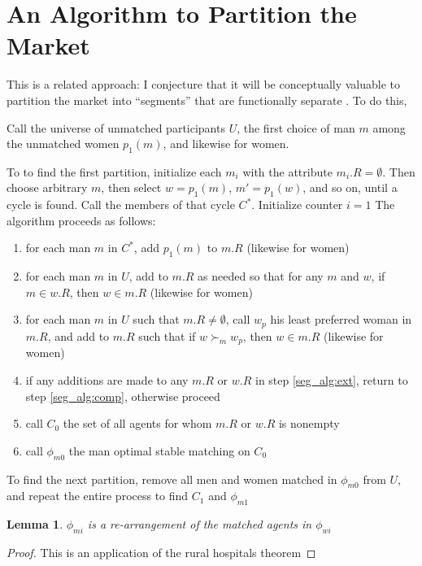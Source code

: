 \documentclass[WP]{AEA}
\newtheorem{lemma}{Lemma}
\begin{document}
\section{An Algorithm to Partition the Market} \label{sect:partition}
This is a related approach: I conjecture that it will be conceptually valuable to partition the market into ``segments'' that are functionally separate .  To do this, 


Call the universe of unmatched participants $U$, the first choice of man $m$ among the unmatched women $p_1(m)$, and likewise for women.


To to find the first partition, initialize each $m_i$ with the attribute $m_i.R = \emptyset$. Then choose arbitrary $m$, then select $w = p_1(m)$, $m' = p_1(w)$, and so on, until a cycle is found. Call the members of that cycle $C^*$. Initialize counter $i = 1$  The algorithm proceeds as follows: 


\begin{enumerate}
	\item for each man $m$ in $C^*$, add $p_1(m)$ to $m.R$ (likewise for women)
	\item  \label{seg_alg:comp} for each man $m$ in $U$, add to $m.R$ as needed so that for any $m$ and $w$, if $m \in w.R$, then $w \in m.R$  (likewise for women)
	\item  \label{seg_alg:ext} for each man $m$ in $U$ such that $m.R \neq \emptyset$, call  $w_p$ his least preferred woman in $m.R$, and add to $m.R$ such that if $w \succ_{m} w_p$, then $w \in m.R$ (likewise for women)
	\item if any additions are made to any $m.R$ or $w.R$ in step \ref*{seg_alg:ext}, return to step \ref*{seg_alg:comp}, otherwise proceed
	\item call $C_0$ the set of all agents for whom $m.R$ or $w.R$ is nonempty
	\item  call $\phi_{m0}$ the man optimal stable matching on $C_0$
\end{enumerate}

To find the next partition, remove all men and women matched in $\phi_{m0}$ from $U$, and repeat the entire process to find $C_1$ and $\phi_{m1}$

\begin{lemma}
	$\phi_{mi}$ is a re-arrangement of the matched agents in $\phi_{wi}$
\end{lemma}
\begin{proof}
	This is an application of the rural hospitals theorem
\end{proof}
\end{document}
